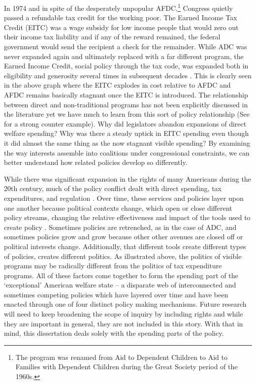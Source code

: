 \documentclass[12pt]{article}
\begin{document}
In 1974 and in spite of the desperately unpopular AFDC,\footnote{The program was renamed from Aid to Dependent Children to Aid to Families with Dependent Children during the Great Society period of the 1960s.} Congress quietly passed a refundable tax credit for the working poor. The Earned Income Tax Credit (EITC) was a wage subsidy for low income people that would zero out their income tax liability and if any of the reward remained, the federal government would send the recipient a check for the remainder. While ADC was never expanded again and ultimately replaced with a far different program, the Earned Income Credit, social policy through the tax code, was expanded both in eligibility and generosity several times in subsequent decades \citep{stewart1991, myles1997}. This is clearly seen in the above graph where the EITC explodes in cost relative to AFDC and AFDC remains basically stagnant once the EITC is introduced. The relationship between direct and non-traditional programs has not been  explicitly discussed in the literature yet we have much to learn from this sort of policy relationship (See \citet{hacker2002} for a strong counter example). Why did legislators abandon expansions of direct welfare spending? Why was there a steady uptick in EITC spending even though it did almost the same thing as the now stagnant visible spending? By examining the way interests assemble into coalitions under congressional constraints, we can better understand how related policies develop so differently.

While there was significant expansion in the rights of many Americans during the 20th century, much of the policy conflict dealt with direct spending, tax expenditures, and regulation \citep{pierson2007}. Over time, these services and policies layer upon one another because political contexts change, which open or close different policy streams, changing the relative effectiveness and impact of the tools used to create policy \citep{kingdon2011}. Sometimes policies are retrenched, as in the case of ADC, and sometimes policies grow and grow because other other avenues are closed off or political interests change. Additionally, that different tools create different types of policies, creates different politics. As illustrated above, the politics of visible programs may be radically different from the politics of tax expenditure programs. All of these factors come together to form the spending part of the `exceptional' American welfare state -- a disparate web of interconnected and sometimes competing policies which have layered over time and have been enacted through one of four distinct policy making mechanisms. Future research will need to keep broadening the scope of inquiry by including rights and while they are important in general, they are not included in this story. With that in mind, this dissertation deals solely with the spending parts of the policy. 
\end{document}
